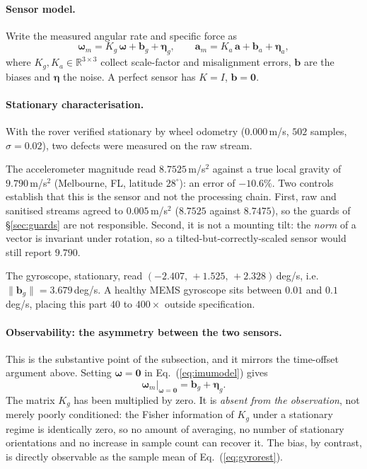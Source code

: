 \paragraph{Sensor model.} Write the measured angular rate and specific force as
\begin{equation}
\boldsymbol{\omega}_m = K_g\,\boldsymbol{\omega} + \mathbf{b}_g
                        + \boldsymbol{\eta}_g,
\qquad
\mathbf{a}_m = K_a\,\mathbf{a} + \mathbf{b}_a + \boldsymbol{\eta}_a ,
\label{eq:imumodel}
\end{equation}
where $K_g, K_a \in \mathbb{R}^{3\times3}$ collect scale-factor and
misalignment errors, $\mathbf{b}$ are the biases and $\boldsymbol{\eta}$ the
noise. A perfect sensor has $K = I$, $\mathbf{b} = \mathbf{0}$.

\paragraph{Stationary characterisation.} With the rover verified stationary by
wheel odometry ($0.000$\,m/s, $502$ samples, $\sigma = 0.02$), two defects were
measured on the raw  stream.

The accelerometer magnitude read $8.7525$\,m/s$^2$ against a true local gravity
of $9.790$\,m/s$^2$ (Melbourne, FL, latitude $28^\circ$): an error of
$-10.6\%$. Two controls establish that this is the sensor and not the
processing chain. First, raw and sanitised streams agreed to $0.005$\,m/s$^2$
($8.7525$ against $8.7475$), so the guards of
\S\ref{sec:guards} are not responsible. Second, it is not a mounting
tilt: the \emph{norm} of a vector is invariant under rotation, so a
tilted-but-correctly-scaled sensor would still report $9.790$.

The gyroscope, stationary, read
$(-2.407,\, +1.525,\, +2.328)$\,deg/s, i.e.\
$\lVert \mathbf{b}_g \rVert = 3.679$\,deg/s. A healthy MEMS gyroscope sits
between $0.01$ and $0.1$\,deg/s, placing this part $40$ to $400\times$ outside
specification.

\paragraph{Observability: the asymmetry between the two sensors.} This is the
substantive point of the subsection, and it mirrors the time-offset argument
above. Setting $\boldsymbol{\omega} = \mathbf{0}$ in
Eq.~(\ref{eq:imumodel}) gives
\begin{equation}
\boldsymbol{\omega}_m\big|_{\boldsymbol{\omega}=\mathbf{0}}
  = \mathbf{b}_g + \boldsymbol{\eta}_g .
\label{eq:gyrorest}
\end{equation}
The matrix $K_g$ has been multiplied by zero. It is \emph{absent from the
observation}, not merely poorly conditioned: the Fisher information of $K_g$
under a stationary regime is identically zero, so no amount of averaging, no
number of stationary orientations and no increase in sample count can recover
it. The bias, by contrast, is directly observable as the sample mean of
Eq.~(\ref{eq:gyrorest}).

